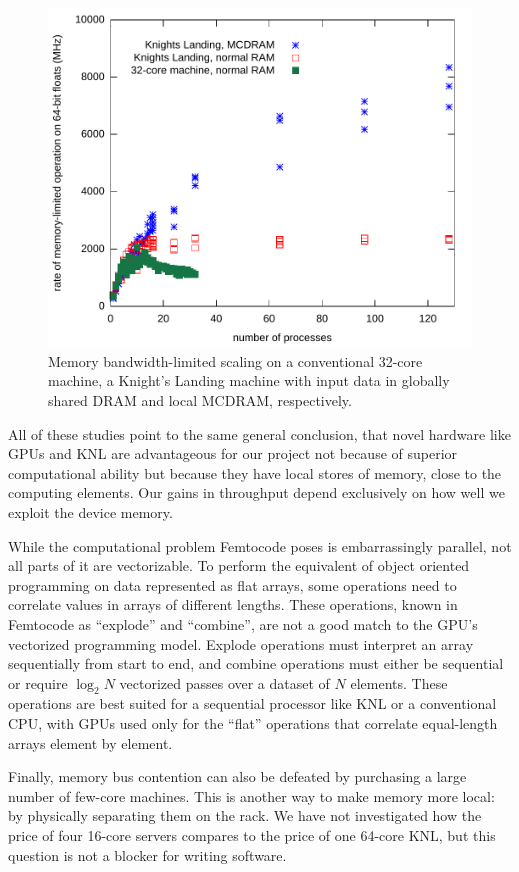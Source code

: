 \documentclass[12pt]{article}
\begin{document}
\begin{figure}[t]
\begin{center}
\includegraphics[width=0.8\linewidth]{knl-scaling.pdf}
\end{center}

\caption{\label{knl-scaling} Memory bandwidth-limited scaling on a conventional 32-core machine, a Knight's Landing machine with input data in globally shared DRAM and local MCDRAM, respectively.}
\end{figure}

All of these studies point to the same general conclusion, that novel hardware like GPUs and KNL are advantageous for our project not because of superior computational ability but because they have local stores of memory, close to the computing elements. Our gains in throughput depend exclusively on how well we exploit the device memory.

While the computational problem Femtocode poses is embarrassingly parallel, not all parts of it are vectorizable. To perform the equivalent of object oriented programming on data represented as flat arrays, some operations need to correlate values in arrays of different lengths. These operations, known in Femtocode as ``explode'' and ``combine'', are not a good match to the GPU's vectorized programming model. Explode operations must interpret an array sequentially from start to end, and combine operations must either be sequential or require $\log_2 N$ vectorized passes over a dataset of $N$ elements. These operations are best suited for a sequential processor like KNL or a conventional CPU, with GPUs used only for the ``flat'' operations that correlate equal-length arrays element by element.

Finally, memory bus contention can also be defeated by purchasing a large number of few-core machines. This is another way to make memory more local: by physically separating them on the rack. We have not investigated how the price of four 16-core servers compares to the price of one 64-core KNL, but this question is not a blocker for writing software.
\end{document}
